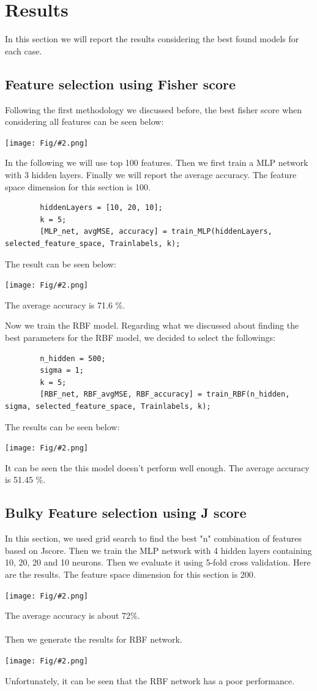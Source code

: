 \documentclass[]{article}
\newcommand{\pict}[2]{\begin{center}
		\texttt{[image: Fig/\#2.png]}
\end{center}}
\begin{document}
	\section{Results}
	In this section we will report the results considering the best found models for each case.
	\subsection{Feature selection using Fisher score}
	Following the first methodology we discussed before, the best fisher score when considering all features can be seen below:
	\pict{1}{F5}
	In the following we will use top 100 features. Then we first train a MLP network with 3 hidden layers. Finally we will report the average accuracy. The feature space dimension for this section is 100.
	\begin{lstlisting}
		hiddenLayers = [10, 20, 10];
		k = 5;
		[MLP_net, avgMSE, accuracy] = train_MLP(hiddenLayers, selected_feature_space, Trainlabels, k);
	\end{lstlisting}
	The result can be seen below:
	\pict{0.6}{F6}
	The average accuracy is 71.6 \%.
	
	Now we train the RBF model. Regarding what we discussed about finding the best parameters for the RBF model, we decided to select the followings:
	\begin{lstlisting}
		n_hidden = 500;
		sigma = 1;
		k = 5;
		[RBF_net, RBF_avgMSE, RBF_accuracy] = train_RBF(n_hidden, sigma, selected_feature_space, Trainlabels, k);
	\end{lstlisting}
	The results can be seen below:
	\pict{0.6}{F7}
	It can be seen the this model doesn't perform well enough. The average accuracy is 51.45 \%.
	
	\subsection{Bulky Feature selection using J score}
	In this section, we used grid search to find the best "n" combination of features based on Jscore. Then we train the MLP network with 4 hidden layers containing 10, 20, 20 and 10 neurons. Then we evaluate it using 5-fold cross validation. Here are the results. The feature space dimension for this section is 200.
	\pict{0.6}{F8}
	The average accuracy is about 72\%.\\\\
	Then we generate the results for RBF network.
	\pict{0.6}{F9}
	Unfortunately, it can be seen that the RBF network has a poor performance.
	
\end{document}
